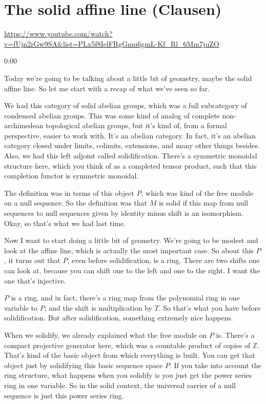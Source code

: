 
\section{\ufs The solid affine line (Clausen)}

\url{https://www.youtube.com/watch?v=fUjn2rGw9SA&list=PLx5f8IelFRgGmu6gmL-Kf_Rl_6Mm7juZO}
\renewcommand{\yt}[2]{\href{https://www.youtube.com/watch?v=fUjn2rGw9SA&list=PLx5f8IelFRgGmu6gmL-Kf_Rl_6Mm7juZO&t=#1}{#2}}
\vspace{1em}

\begin{unfinished}{0:00}

Today we're going to be talking about a little bit of geometry, maybe the solid affine line. So let me start with a recap of what we've seen so far.

We had this category of solid abelian groups, which was a full subcategory of condensed abelian groups. This was some kind of analog of complete non-archimedean topological abelian groups, but it's kind of, from a formal perspective, easier to work with. It's an abelian category. In fact, it's an abelian category closed under limits, colimits, extensions, and many other things besides. Also, we had this left adjoint called solidification. There's a symmetric monoidal structure here, which you think of as a completed tensor product, such that this completion functor is symmetric monoidal.

The definition was in terms of this object $P$, which was kind of the free module on a null sequence. So the definition was that $M$ is solid if this map from null sequences to null sequences given by identity minus shift is an isomorphism. Okay, so that's what we had last time.

Now I want to start doing a little bit of geometry. We're going to be modest and look at the affine line, which is actually the most important case. So about this $P$, it turns out that $P$, even before solidification, is a ring. There are two shifts one can look at, because you can shift one to the left and one to the right. I want the one that's injective.

$P$ is a ring, and in fact, there's a ring map from the polynomial ring in one variable to $P$, and the shift is multiplication by $T$. So that's what you have before solidification. But after solidification, something extremely nice happens.

When we solidify, we already explained what the free module on $P$ is. There's a compact projective generator here, which was a countable product of copies of $\mathbb{Z}$. That's kind of the basic object from which everything is built. You can get that object just by solidifying this basic sequence space $P$. If you take into account the ring structure, what happens when you solidify is you just get the power series ring in one variable. So in the solid context, the universal carrier of a null sequence is just this power series ring.


\end{unfinished}
